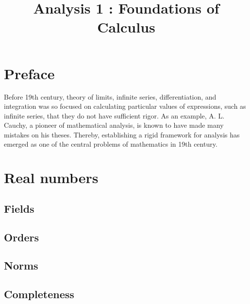 \documentclass{../crs}
\title{Analysis 1 : Foundations of Calculus}
\begin{document}
\maketitle
\tableofcontents


\frontmatter

\chapter*{Preface}

Before 19th century, theory of limits, infinite series, differentiation, and integration was so focused on calculating particular values of expressions, such as infinite series, that they do not have sufficient rigor.
As an example, A. L. Cauchy, a pioneer of mathematical analysis, is known to have made many mistakes on his theses.
Thereby, establishing a rigid framework for analysis has emerged as one of the central problems of mathematics in 19th century.%





\mainmatter

\chapter{Real numbers}

\section{Fields}




\section{Orders}




\section{Norms}




\section{Completeness}
\end{document}
